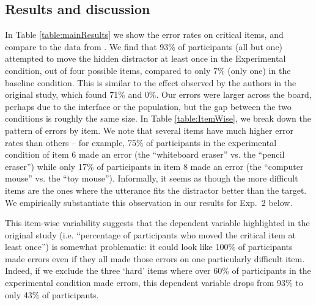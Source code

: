 \documentclass[10pt,letterpaper]{article}
\begin{document}
\subsection{Results and discussion}
In Table \ref{table:mainResults} we show the error rates on critical items, and compare to the data from
.
We find that 93\% of participants (all but one) attempted to move the hidden distractor at least once in the Experimental condition, out of four possible items, compared to only 7\% (only one) in the baseline condition. This is similar to the effect observed by the authors in the original study, which found 71\% and 0\%. Our errors were larger across the board, perhaps due to the interface or the population, but the gap between the two conditions is roughly the same size.
In Table \ref{table:ItemWise}, we break down the pattern of errors by item. 
We note that several items have much higher error rates than others -- for example, 75\% of participants in the experimental condition of item 6 made an error (the ``whiteboard eraser'' vs. the ``pencil eraser'') while only 17\% of participants in item 8 made an error (the ``computer mouse'' vs. the ``toy mouse''). Informally, it seems as though the more difficult items are the ones where the utterance fits the distractor better than the target. We empirically substantiate this observation in our results for Exp.~2 below.

This item-wise variability suggests that the dependent variable highlighted in the original study (i.e. ``percentage of participants who moved the critical item at least once'') is somewhat problematic: it could look like 100\% of participants made errors even if they all made those errors on one particularly difficult item. Indeed, if we exclude the three `hard' items where over 60\% of participants in the experimental condition made errors, this dependent variable drops from 93\% to only 43\% of participants. 
\end{document}
